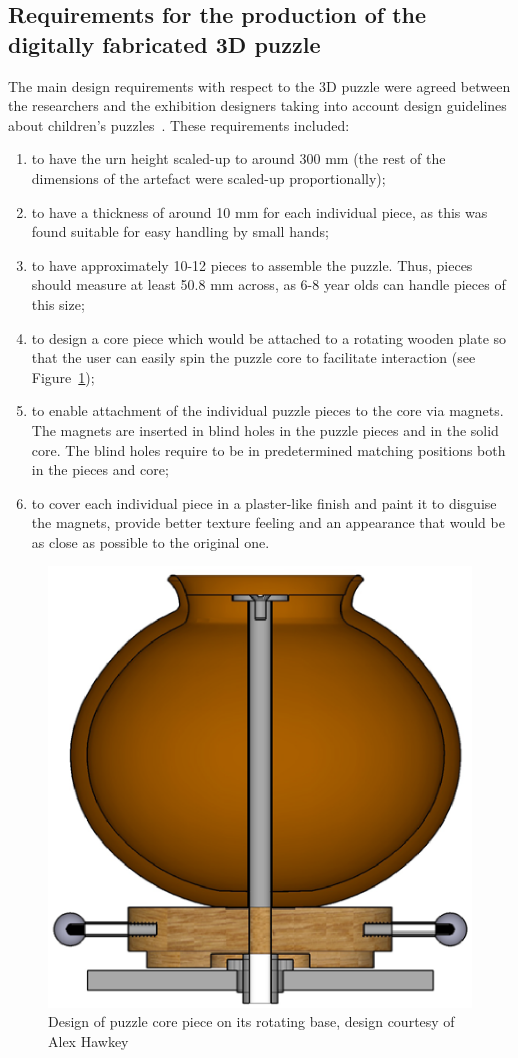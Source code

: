 \documentclass[acmlarge,screen,dvipsnames]{acmart}
\begin{document}
\subsection{Requirements for the production of the digitally fabricated 3D puzzle}

The main design requirements with respect to the 3D puzzle were agreed
between the researchers and the exhibition designers taking into
account design guidelines about children's
puzzles~\cite{Smith2002}. These requirements included:
%
\begin{enumerate}
\item to have the urn height scaled-up to around 300 mm (the rest of
  the dimensions of the artefact were scaled-up proportionally);
\item to have a thickness of around 10 mm for each individual piece,
  as this was found suitable for easy handling by small hands;
\item to have approximately 10-12 pieces to assemble the puzzle. Thus,
  pieces should measure at least 50.8 mm across, as 6-8 year olds can
  handle pieces of this size;
\item to design a core piece which would be attached to a rotating
  wooden plate so that the user can easily spin the puzzle core to
  facilitate interaction (see Figure~\ref{fig:alexdesign});
\item to enable attachment of the individual puzzle pieces to the core
  via magnets. The magnets are inserted in blind holes in the puzzle
  pieces and in the solid core. The blind holes require to be in
  predetermined matching positions both in the pieces and core;
\item to cover each individual piece in a plaster-like finish and
  paint it to disguise the magnets, provide better texture feeling and
  an appearance that would be as close as possible to the original one.
\end{enumerate} 
%
\begin{figure}[htb]
  \centering
  \includegraphics[width=0.5\linewidth]{images/alexdesign}
  \caption{\label{fig:alexdesign}%
    Design of puzzle core piece on its rotating base, design courtesy of Alex Hawkey}
\end{figure}
\end{document}
